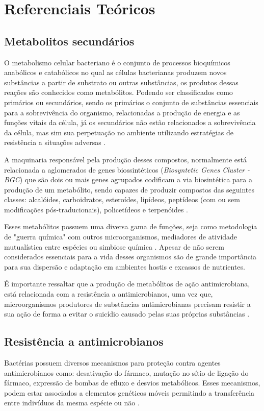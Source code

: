 \chapter{Referenciais Teóricos}\label{cap:referenciais_teoricos}

\section{Metabolitos secundários}

O metabolismo celular bacteriano é o conjunto de processos bioquímicos anabólicos e catabólicos no qual
as células bacterianas produzem novos substâncias a partir de substrato ou outras substâncias, os produtos
dessas reações são conhecidos como metabólitos. Podendo ser classificados como primários ou secundários, 
sendo os primários o conjunto de substâncias essenciais para a sobrevivência do organismo, relacionadas 
a produção de energia e as funções vitais da célula, já os secundários não estão relacionados a sobrevivência
da célula, mas sim sua perpetuação no ambiente utilizando estratégias de resistência a situações adversas \cite{gokulan2014}.  

A maquinaria responsável pela produção desses compostos, normalmente está relacionada a aglomerados 
de genes biossintéticos (\textit{Biosyntetic Genes Cluster - BGC}) que são dois ou mais genes 
agrupados codificam a via biosintética para a produção de um metabólito, sendo capazes de produzir compostos
das seguintes classes: alcalóides, carboidratos, esteroídes, lipídeos, peptídeos (com ou sem modificações pós-traducionais), policetídeos e
terpenóides \cite{medema2015}. 

Esses metabólitos possuem uma diversa gama de funções, seja como metodologia de "guerra
química" com outros microorganismos, mediadores de atividade mutualística entre espécies ou
simbiose química \cite{obrien2011}. Apesar de não serem considerados essenciais para a vida 
desses organismos \cite{demain2009} são de grande importância para sua dispersão e adaptação
em ambientes hostis e excassos de nutrientes. 

É importante ressaltar que a produção de metabólitos de ação antimicrobiana, está relacionada
com a resistência a antimicrobianos, uma vez que, microorganismos produtores de substâncias antimicrobianas
precisam resistir a sua ação de forma a evitar o suicídio causado pelas suas próprias substâncias \cite{cundliffe2010avoidance}.

\section{Resistência a antimicrobianos}
Bactérias possuem diversos mecanismos para proteção contra agentes antimicrobianos como: desativação do fármaco, 
mutação no sítio de ligação do fármaco, expressão de bombas de efluxo e desvios metabólicos. Esses mecanismos, podem
estar associados a elementos genéticos móveis permitindo a transferência entre indivíduos da mesma espécie ou não \cite[p. 150]{Madigan2021}.

